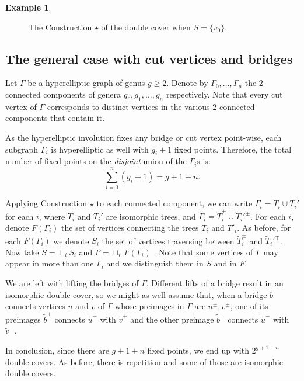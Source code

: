 \documentclass[11pt]{article}
\theoremstyle{definition}
\newtheorem{exam}[theo]{Example}
\numberwithin{equation}{section}
\theoremstyle{definition}
\newcommand{\Ga}{\Gamma}
\newcommand{\wt}[1]{\widetilde{#1}}
\begin{document}
{\begin{exam}
\begin{figure}[ht]
 \caption[below]{The Construction $\star$ of the double cover when $S=\{v_0\}$. }
  \label{fig1}
 \end{figure}
\end{exam}

\subsection{The general case with cut vertices and bridges}\label{generalcase}

Let $\Gamma$ be a hyperelliptic graph of genus $g\geq 2$.
Denote by $\Gamma_0,\dots,\Gamma_{n}$ the $2$-connected components of genera $g_0, g_1,\ldots,g_n$ respectively. Note that every cut vertex of $\Gamma$  corresponds to distinct vertices in the various 2-connected components that contain it. 

As the hyperelliptic involution fixes  any bridge or cut vertex point-wise, each subgraph $\Ga_i$ is hyperelliptic as well with $g_i+1$ fixed points. 
Therefore,  the total number of  fixed points on the \emph{disjoint} union of the $\Gamma_i$s is: \[\sum_{i=0}^{n}(g_{i}+1)=g+1+n.\] 


Applying Construction $\star$ to each connected component, we can write 
 $\Gamma_i = T_i\cup T_i'$ for each $i$, where  $T_i$ and $T_i'$ are isomorphic trees, and $\wt\Gamma_i = \wt T_i^{\pm}\cup\wt T_i'^{\pm}$.  
 For each $i$, denote $F(\Gamma_i)$  the set of vertices  connecting the trees $T_i$ and $T'_i$.
 As before, for each $F(\Gamma_i)$ we denote $S_i$ the set of vertices  traversing between $\wt T_i^{\pm}$ and $\wt T_i'^{\mp}$.
Now take  $S=\sqcup_i S_i$ and  $F=\sqcup_i\, F(\Ga_i)$ . Note that some vertices of $\Gamma$ may appear in more than one $\Gamma_i$ and we  distinguish them in $S$ and in $F$. 
  
 We are left with lifting  the bridges of $\Gamma$.  Different lifts of a bridge result in an isomorphic double cover, so we might as well assume that, when a bridge $b$ connects vertices $u$ and $v$ of $\Gamma$ whose preimages in $\wt\Gamma$ are $u^{\pm},v^{\pm}$,
 one of its preimages  $\wt b^{+}$ connects  $\tilde u^+$ with $\tilde v^+$ and the other preimage $\wt b^{-}$ connects  $\tilde u^-$ with $\tilde v^-$.

In conclusion, since there are $g+1+n$ fixed points, we end up with  $2^{g+1+n}$ double covers. As before, there is repetition and some of those are isomorphic double covers. 


}
\end{document}
